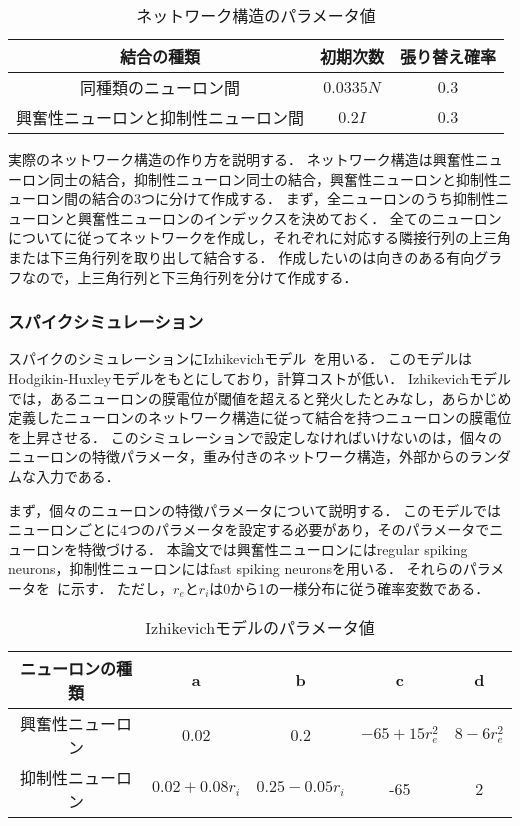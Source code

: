 \begin{table}[htb]
  \center
  \begin{tabular}{|c|cc|} \hline
    結合の種類 & 初期次数 & 張り替え確率 \\ \hline
		同種類のニューロン間 & $0.0335 N$ & $0.3$ \\
		興奮性ニューロンと抑制性ニューロン間 & $0.2I$ & $0.3$\\ \hline
  \end{tabular}
  \caption{ネットワーク構造のパラメータ値}
  \label{tab:parameter1}
\end{table}

実際のネットワーク構造の作り方を説明する．
ネットワーク構造は興奮性ニューロン同士の結合，抑制性ニューロン同士の結合，興奮性ニューロンと抑制性ニューロン間の結合の3つに分けて作成する．
まず，全ニューロンのうち抑制性ニューロンと興奮性ニューロンのインデックスを決めておく．
全てのニューロンについてに従ってネットワークを作成し，それぞれに対応する隣接行列の上三角または下三角行列を取り出して結合する．
作成したいのは向きのある有向グラフなので，上三角行列と下三角行列を分けて作成する．

\subsubsection{スパイクシミュレーション}
スパイクのシミュレーションにIzhikevichモデル~\cite{Izhikevich2003}を用いる．
このモデルはHodgikin-Huxleyモデルをもとにしており，計算コストが低い．
Izhikevichモデルでは，あるニューロンの膜電位が閾値を超えると発火したとみなし，あらかじめ定義したニューロンのネットワーク構造に従って結合を持つニューロンの膜電位を上昇させる．
このシミュレーションで設定しなければいけないのは，個々のニューロンの特徴パラメータ，重み付きのネットワーク構造，外部からのランダムな入力である．

まず，個々のニューロンの特徴パラメータについて説明する．
このモデルではニューロンごとに4つのパラメータを設定する必要があり，そのパラメータでニューロンを特徴づける．
本論文では興奮性ニューロンにはregular spiking neurons，抑制性ニューロンにはfast spiking neuronsを用いる．
それらのパラメータを~に示す．
ただし，$r_e$と$r_i$は0から1の一様分布に従う確率変数である．

\begin{table}[htb]
  \center
  \begin{tabular}{|c|cccc|} \hline
    ニューロンの種類 & a & b & c & d \\ \hline
    興奮性ニューロン & 0.02 & 0.2 & $-65 + 15 r_e^2$ & $8 - 6r_e^2$ \\
    抑制性ニューロン & $0.02 + 0.08r_i$ & $0.25 - 0.05 r_i$ & -65 & 2 \\ \hline
  \end{tabular}
  \caption{Izhikevichモデルのパラメータ値}
  \label{tab:parameter2}
\end{table}

